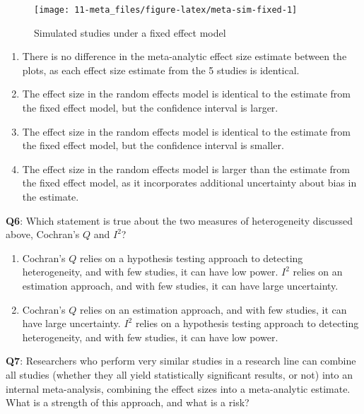 \documentclass[
  oneside]{krantz}
\providecommand{\tightlist}{%
  \setlength{\itemsep}{0pt}\setlength{\parskip}{0pt}}
\begin{document}
\begin{figure}

{\centering \texttt{[image: 11-meta\_files/figure-latex/meta-sim-fixed-1]} 

}

\caption{Simulated studies under a fixed effect model}\label{fig:meta-sim-fixed}
\end{figure}

\begin{enumerate}
\def\labelenumi{\Alph{enumi})}
\tightlist
\item
  There is no difference in the meta-analytic effect size estimate between the plots, as each effect size estimate from the 5 studies is identical.
\item
  The effect size in the random effects model is identical to the estimate from the fixed effect model, but the confidence interval is larger.
\item
  The effect size in the random effects model is identical to the estimate from the fixed effect model, but the confidence interval is smaller.
\item
  The effect size in the random effects model is larger than the estimate from the fixed effect model, as it incorporates additional uncertainty about bias in the estimate.
\end{enumerate}

\textbf{Q6}: Which statement is true about the two measures of heterogeneity discussed above, Cochran's \(Q\) and \(I^2\)?

\begin{enumerate}
\def\labelenumi{\Alph{enumi})}
\tightlist
\item
  Cochran's \(Q\) relies on a hypothesis testing approach to detecting heterogeneity, and with few studies, it can have low power. \(I^2\) relies on an estimation approach, and with few studies, it can have large uncertainty.
\item
  Cochran's \(Q\) relies on an estimation approach, and with few studies, it can have large uncertainty. \(I^2\) relies on a hypothesis testing approach to detecting heterogeneity, and with few studies, it can have low power.
\end{enumerate}

\textbf{Q7}: Researchers who perform very similar studies in a research line can combine all studies (whether they all yield statistically significant results, or not) into an internal meta-analysis, combining the effect sizes into a meta-analytic estimate. What is a strength of this approach, and what is a risk?
\end{document}
